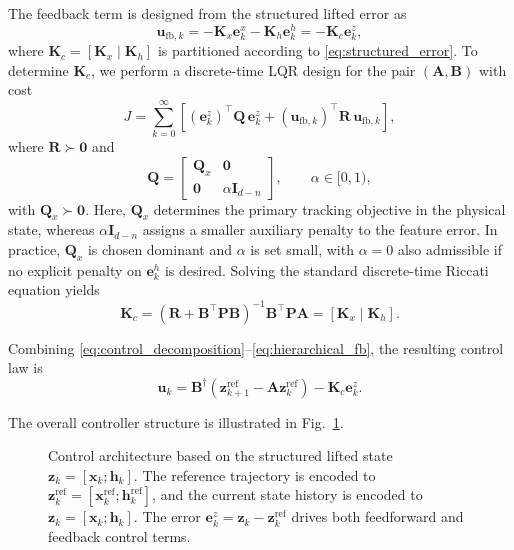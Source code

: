 \documentclass[journal]{IEEEtran}
\newcommand{\vx}{\mathbf{x}}
\newcommand{\vu}{\mathbf{u}}
\newcommand{\vz}{\mathbf{z}}
\newcommand{\vh}{\mathbf{h}}
\newcommand{\ve}{\mathbf{e}}
\newcommand{\mA}{\mathbf{A}}
\newcommand{\mB}{\mathbf{B}}
\newcommand{\mQ}{\mathbf{Q}}
\newcommand{\mR}{\mathbf{R}}
\newcommand{\mP}{\mathbf{P}}
\newcommand{\mK}{\mathbf{K}}
\newcommand{\mI}{\mathbf{I}}
\begin{document}
The feedback term is designed from the structured lifted error as
\begin{equation}
    \vu_{\mathrm{fb},k}
    =
    -\mK_x \ve_k^x - \mK_h \ve_k^h
    =
    -\mK_c \ve_k^z,
    \label{eq:hierarchical_fb}
\end{equation}
where $\mK_c = [\mK_x\;|\;\mK_h]$ is partitioned according to \eqref{eq:structured_error}. To determine $\mK_c$, we perform a discrete-time LQR design for the pair $(\mA,\mB)$ with cost
\begin{equation}
    J = \sum_{k=0}^{\infty}
    \left[
        (\ve_k^z)^\top \mQ\,\ve_k^z
        +
        (\vu_{\mathrm{fb},k})^\top \mR\,\vu_{\mathrm{fb},k}
    \right],
    \label{eq:lqr_objective}
\end{equation}
where $\mR \succ \mathbf{0}$ and
\begin{equation}
    \mQ =
    \begin{bmatrix}
        \mQ_x & \mathbf{0} \\
        \mathbf{0} & \alpha \mI_{d-n}
    \end{bmatrix},
    \qquad \alpha \in [0,1),
    \label{eq:block_diag_Q}
\end{equation}
with $\mQ_x \succ \mathbf{0}$. Here, $\mQ_x$ determines the primary tracking objective in the physical state, whereas $\alpha \mI_{d-n}$ assigns a smaller auxiliary penalty to the feature error. In practice, $\mQ_x$ is chosen dominant and $\alpha$ is set small, with $\alpha = 0$ also admissible if no explicit penalty on $\ve_k^h$ is desired. Solving the standard discrete-time Riccati equation yields
\begin{equation}
    \mK_c
    =
    (\mR + \mB^\top \mP \mB)^{-1} \mB^\top \mP \mA
    =
    [\mK_x\;|\;\mK_h].
    \label{eq:lqr_gain}
\end{equation}

Combining \eqref{eq:control_decomposition}--\eqref{eq:hierarchical_fb}, the resulting control law is
\begin{equation}
    \vu_k
    =
    \mB^\dagger \!\left(\vz_{k+1}^{\mathrm{ref}} - \mA \vz_k^{\mathrm{ref}}\right)
    - \mK_c \ve_k^z.
    \label{eq:full_ctrl}
\end{equation}

The overall controller structure is illustrated in Fig.~\ref{fig:control_architecture}.

\begin{figure}[!t]
    \centering
    \caption{Control architecture based on the structured lifted state $\vz_k=[\vx_k;\vh_k]$. The reference trajectory is encoded to $\vz_k^{\mathrm{ref}}=[\vx_k^{\mathrm{ref}};\vh_k^{\mathrm{ref}}]$, and the current state history is encoded to $\vz_k=[\vx_k;\vh_k]$. The error $\ve_k^z = \vz_k - \vz_k^{\mathrm{ref}}$ drives both feedforward and feedback control terms.}
    \label{fig:control_architecture}
\end{figure}
\end{document}
